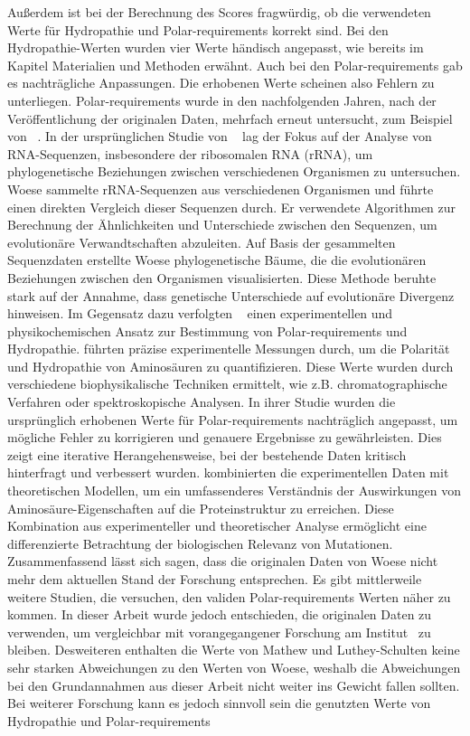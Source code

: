 \documentclass[german,version-2022-01]{uzl-thesis}
\begin{document}
Au\ss{}erdem ist bei der Berechnung des Scores fragw\"urdig, ob die verwendeten Werte f\"ur Hydropathie und Polar-requirements korrekt sind. Bei den Hydropathie-Werten wurden vier Werte h\"andisch angepasst, wie bereits im Kapitel Materialien und Methoden erw\"ahnt. Auch bei den Polar-requirements gab es nachtr\"agliche Anpassungen. Die erhobenen Werte scheinen also Fehlern zu unterliegen. Polar-requirements wurde in den nachfolgenden Jahren, nach der Ver\"offentlichung der originalen Daten, mehrfach erneut untersucht, zum Beispiel von \citeauthor{mathew_physical_2008}~\cite{mathew_physical_2008}. In der urspr\"unglichen Studie von \citeauthor{woese_fundamental_1966}~\cite{woese_fundamental_1966} lag der Fokus auf der Analyse von RNA-Sequenzen, insbesondere der ribosomalen RNA (rRNA), um phylogenetische Beziehungen zwischen verschiedenen Organismen zu untersuchen. Woese sammelte rRNA-Sequenzen aus verschiedenen Organismen und f\"uhrte einen direkten Vergleich dieser Sequenzen durch. Er verwendete Algorithmen zur Berechnung der \"Ahnlichkeiten und Unterschiede zwischen den Sequenzen, um evolution\"are Verwandtschaften abzuleiten. Auf Basis der gesammelten Sequenzdaten erstellte Woese phylogenetische B\"aume, die die evolution\"aren Beziehungen zwischen den Organismen visualisierten. Diese Methode beruhte stark auf der Annahme, dass genetische Unterschiede auf evolution\"are Divergenz hinweisen. Im Gegensatz dazu verfolgten \citeauthor{mathew_physical_2008}~\cite{mathew_physical_2008} einen experimentellen und physikochemischen Ansatz zur Bestimmung von Polar-requirements und Hydropathie. \citeauthor{mathew_physical_2008} f\"uhrten pr\"azise experimentelle Messungen durch, um die Polarit\"at und Hydropathie von Aminos\"auren zu quantifizieren. Diese Werte wurden durch verschiedene biophysikalische Techniken ermittelt, wie z.B. chromatographische Verfahren oder spektroskopische Analysen. In ihrer Studie wurden die urspr\"unglich erhobenen Werte f\"ur Polar-requirements nachtr\"aglich angepasst, um m\"ogliche Fehler zu korrigieren und genauere Ergebnisse zu gew\"ahrleisten. Dies zeigt eine iterative Herangehensweise, bei der bestehende Daten kritisch hinterfragt und verbessert wurden. \citeauthor{mathew_physical_2008} kombinierten die experimentellen Daten mit theoretischen Modellen, um ein umfassenderes Verst\"andnis der Auswirkungen von Aminos\"aure-Eigenschaften auf die Proteinstruktur zu erreichen. Diese Kombination aus experimenteller und theoretischer Analyse erm\"oglicht eine differenzierte Betrachtung der biologischen Relevanz von Mutationen. Zusammenfassend l\"asst sich sagen, dass die originalen Daten von Woese nicht mehr dem aktuellen Stand der Forschung entsprechen. Es gibt mittlerweile weitere Studien, die versuchen, den validen Polar-requirements Werten n\"aher zu kommen. In dieser Arbeit wurde jedoch entschieden, die originalen Daten zu verwenden, um vergleichbar mit vorangegangener Forschung am Institut~\cite{nina} zu bleiben. Desweiteren enthalten die Werte von Mathew und Luthey-Schulten keine sehr starken Abweichungen zu den Werten von Woese, weshalb die Abweichungen bei den Grundannahmen aus dieser Arbeit nicht weiter ins Gewicht fallen sollten. Bei weiterer Forschung kann es jedoch sinnvoll sein die genutzten Werte von Hydropathie und Polar-requirements 
\end{document}

